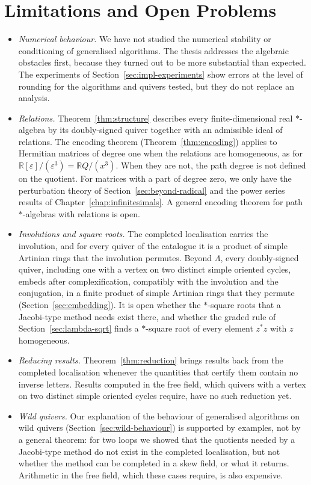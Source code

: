 \documentclass[12pt, a4paper]{report}
\theoremstyle{plain}
\theoremstyle{definition}
\theoremstyle{remark}
\theoremstyle{plain}
\newcommand{\RR}{\mathbb{R}}
\begin{document}
\section{Limitations and Open Problems}
\label{sec:open-problems}
\begin{itemize}
  \item \emph{Numerical behaviour.} We have not studied the numerical stability or conditioning of generalised algorithms. The thesis addresses the algebraic obstacles first, because they turned out to be more substantial than expected. The experiments of Section~\ref{sec:impl-experiments} show errors at the level of rounding for the algorithms and quivers tested, but they do not replace an analysis.
  \item \emph{Relations.} Theorem~\ref{thm:structure} describes every finite-dimensional real $*$-algebra by its doubly-signed quiver together with an admissible ideal of relations. The encoding theorem (Theorem~\ref{thm:encoding}) applies to Hermitian matrices of degree one when the relations are homogeneous, as for $\RR[\varepsilon]/(\varepsilon^3)=\RR Q/(x^3)$. When they are not, the path degree is not defined on the quotient. For matrices with a part of degree zero, we only have the perturbation theory of Section~\ref{sec:beyond-radical} and the power series results of Chapter~\ref{chap:infinitesimals}. A general encoding theorem for path $*$-algebras with relations is open.
  \item \emph{Involutions and square roots.} The completed localisation carries the involution, and for every quiver of the catalogue it is a product of simple Artinian rings that the involution permutes. Beyond $\Lambda$, every doubly-signed quiver, including one with a vertex on two distinct simple oriented cycles, embeds after complexification, compatibly with the involution and the conjugation, in a finite product of simple Artinian rings that they permute (Section~\ref{sec:embedding}). It is open whether the $*$-square roots that a Jacobi-type method needs exist there, and whether the graded rule of Section~\ref{sec:lambda-sqrt} finds a $*$-square root of every element $z^*z$ with $z$ homogeneous.
  \item \emph{Reducing results.} Theorem~\ref{thm:reduction} brings results back from the completed localisation whenever the quantities that certify them contain no inverse letters. Results computed in the free field, which quivers with a vertex on two distinct simple oriented cycles require, have no such reduction yet.
  \item \emph{Wild quivers.} Our explanation of the behaviour of generalised algorithms on wild quivers (Section~\ref{sec:wild-behaviour}) is supported by examples, not by a general theorem: for two loops we showed that the quotients needed by a Jacobi-type method do not exist in the completed localisation, but not whether the method can be completed in a skew field, or what it returns. Arithmetic in the free field, which these cases require, is also expensive.
\end{itemize}
\end{document}
